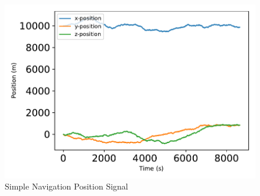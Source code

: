 \begin{figure}[htbp]\centerline{\includegraphics[height=0.4\textwidth, keepaspectratio]{AutoTeX/SimpleNavPos}}\caption{Simple Navigation Position Signal}\label{fig:SimpleNavPos}\end{figure}